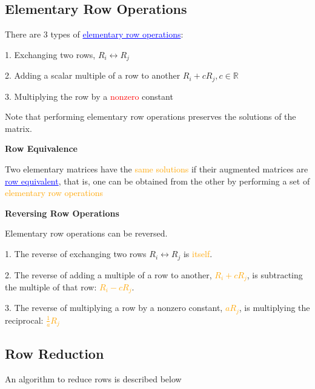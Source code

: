 \documentclass{article}
\newcommand{\bul}[1]{\textcolor{blue}{\underline{#1}}}
\begin{document}
\subsection{Elementary Row Operations}
There are 3 types of \bul{elementary row operations}:

\vspace{10pt}

1. Exchanging two rows, $R_i \leftrightarrow R_j$

2. Adding a scalar multiple of a row to another $R_i + cR_j, c\in \mathbb{R}$

3. Multiplying the row by a \textcolor{red}{nonzero} constant

\vspace{10pt}

Note that performing elementary row operations preserves the solutions of the matrix.

\vspace{10pt}

\textbf{Row Equivalence}

Two elementary matrices have the \textcolor{orange}{same solutions} if their augmented matrices are \bul{row equivalent}, that is, one can be obtained from the other by performing a set of \textcolor{orange}{elementary row operations}

\vspace{10pt}

\textbf{Reversing Row Operations}

Elementary row operations can be reversed.

\vspace{10pt}

1. The reverse of exchanging two rows $R_i \leftrightarrow R_j$ is \textcolor{orange}{itself}.

2. The reverse of adding a multiple of a row to another, \textcolor{orange}{$R_i + cR_j$}, is subtracting the multiple of that row: \textcolor{orange}{$R_i - cR_j$}.

3. The reverse of multiplying a row by a nonzero constant, \textcolor{orange}{$aR_j$}, is multiplying the reciprocal: \textcolor{orange}{$\frac{1}{a}R_j$}

\subsection{Row Reduction}
An algorithm to reduce rows is described below

\vspace{10pt}
\end{document}
